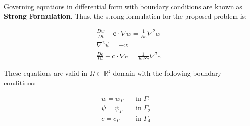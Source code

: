 Governing equations in differential form 
with boundary conditions are known as \textbf{Strong Formulation}. 
Thus, the strong formulation for the proposed problem is:

\begin{align}
& \frac{D w}{D t}
 +
 \textbf{c} \cdot \nabla w
 =
 \frac{1}{Re} \nabla^{2} w
 \\[10pt] 
& \nabla^{2} \psi
 = 
 - 
 w \\[10pt]
& \frac{D e}{Dt}
 +
 \textbf{c} \cdot \nabla e
 =
 \frac{1}{ReSc} \nabla^{2} e
\end{align}


\medskip
\noindent
These equations are valid in 
$\Omega \subset \mathbb{R}^2$ domain
with the following boundary conditions:

\begin{equation} \label{bc}
 \begin{aligned}
  w = w_\Gamma \quad & \mbox{in $\Gamma_1$}\\
  \psi = \psi_\Gamma \quad & \mbox{in $\Gamma_2$}\\
  c = c_\Gamma \quad & \mbox{in $\Gamma_4$}
\end{aligned}
\end{equation}

